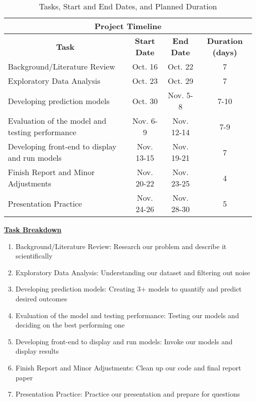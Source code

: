 \documentclass[11pt, letterpaper]{article}
\begin{document}
    \begin{table}[htbp]
        \centering
        \begin{tabular}{l|c|c|c}
            \hline \hline
            \multicolumn{4}{c}{\textbf{Project Timeline}} \\ %
            \hline \hline
            \multicolumn{1}{c|}{\textbf{Task}} & \textbf{Start Date} & \textbf{End Date} & \textbf{Duration (days)} \\
            \hline
            Background/Literature Review & Oct. 16 & Oct. 22 & 7 \\
            \hline
            Exploratory Data Analysis & Oct. 23 & Oct. 29 & 7 \\
            \hline
            Developing prediction models & Oct. 30 & Nov. 5-8 & 7-10 \\
            \hline
            Evaluation of the model and testing performance & Nov. 6-9 & Nov. 12-14 & 7-9 \\
            \hline
            Developing front-end to display and run models & Nov. 13-15 & Nov. 19-21 & 7 \\
            \hline
            Finish Report and Minor Adjustments & Nov. 20-22 & Nov. 23-25 & 4 \\
            \hline
            Presentation Practice & Nov. 24-26 & Nov. 28-30 & 5 \\
            \hline \hline
        \end{tabular}
        \caption{Tasks, Start and End Dates, and Planned Duration}
        \label{tab:timeline}
    \end{table}

    \textbf{\underline{Task Breakdown}}
    \begin{enumerate}
        \item Background/Literature Review: Research our problem and describe it scientifically
        \item Exploratory Data Analysis: Understanding our dataset and filtering out noise
        \item Developing prediction models: Creating 3+ models to quantify and predict desired outcomes
        \item Evaluation of the model and testing performance: Testing our models and deciding on the best performing one
        \item Developing front-end to display and run models: Invoke our models and display results
        \item Finish Report and Minor Adjustments: Clean up our code and final report paper
        \item Presentation Practice: Practice our presentation and prepare for questions
    \end{enumerate}
\end{document}
